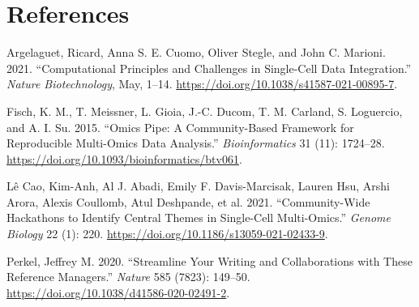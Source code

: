 \documentclass[smallextended]{svjour3}       %
\newlength{\cslhangindent}
\newlength{\cslentryspacingunit} %
\newenvironment{CSLReferences}[2] %
 {%
  \setlength{\parindent}{0pt}
  \ifodd #1
  \let\oldpar\par
  \def\par{\hangindent=\cslhangindent\oldpar}
  \fi
  \setlength{\parskip}{#2\cslentryspacingunit}
 }%
 {}
\begin{document}
\hypertarget{references}{%
\section*{References}\label{references}}

\hypertarget{refs}{}
\begin{CSLReferences}{1}{0}
\leavevmode{}%
Argelaguet, Ricard, Anna S. E. Cuomo, Oliver Stegle, and John C. Marioni. 2021. {``Computational Principles and Challenges in Single-Cell Data Integration.''} \emph{Nature Biotechnology}, May, 1--14. \url{https://doi.org/10.1038/s41587-021-00895-7}.

\leavevmode{}%
Fisch, K. M., T. Meissner, L. Gioia, J.-C. Ducom, T. M. Carland, S. Loguercio, and A. I. Su. 2015. {``Omics {Pipe}: A Community-Based Framework for Reproducible Multi-Omics Data Analysis.''} \emph{Bioinformatics} 31 (11): 1724--28. \url{https://doi.org/10.1093/bioinformatics/btv061}.

\leavevmode{}%
Lê Cao, Kim-Anh, Al J. Abadi, Emily F. Davis-Marcisak, Lauren Hsu, Arshi Arora, Alexis Coullomb, Atul Deshpande, et al. 2021. {``Community-Wide Hackathons to Identify Central Themes in Single-Cell Multi-Omics.''} \emph{Genome Biology} 22 (1): 220. \url{https://doi.org/10.1186/s13059-021-02433-9}.

\leavevmode{}%
Perkel, Jeffrey M. 2020. {``Streamline Your Writing {\textemdash} and Collaborations {\textemdash} with These Reference Managers.''} \emph{Nature} 585 (7823): 149--50. \url{https://doi.org/10.1038/d41586-020-02491-2}.

\end{CSLReferences}




\end{document}
